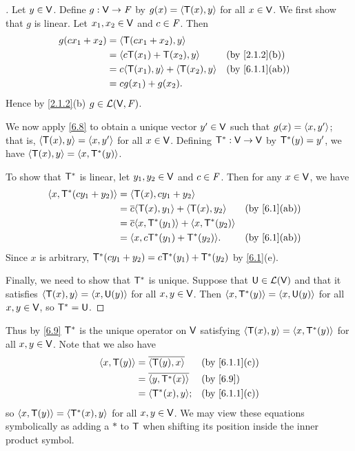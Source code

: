 \begin{proof}[]
	Let \(y \in \mathsf{V}\).
	Define \(g : \mathsf{V} \to \mathit{F}\) by \(g(x) = \left\langle\mathsf{T}(x), y\right\rangle\) for all \(x \in \mathsf{V}\).
	We first show that \(g\) is linear.
	Let \(x_1, x_2 \in \mathsf{V}\) and \(c \in \mathit{F}\).
	Then
	\begin{align*}
		g(c x_1 + x_2) & = \inn{\T(c x_1 + x_2), y}                                  \\
		               & = \inn{c \T(x_1) + \T(x_2), y}          &  & \by{2.1.2}[b]  \\
		               & = c \inn{\T(x_1), y} + \inn{\T(x_2), y} &  & \by{6.1.1}[ab] \\
		               & = c g(x_1) + g(x_2).
	\end{align*}
	Hence by \cref{2.1.2}(b) \(g \in \mathcal{L}(\mathsf{V}, \mathit{F})\).

	We now apply \cref{6.8} to obtain a unique vector \(y' \in \mathsf{V}\) such that \(g(x) = \left\langle x, y'\right\rangle\);
	that is, \(\left\langle\mathsf{T}(x), y\right\rangle = \left\langle x, y'\right\rangle\) for all \(x \in \mathsf{V}\).
	Defining \(\mathsf{T}^* : \mathsf{V} \to \mathsf{V}\) by \(\mathsf{T}^*(y) = y'\), we have \(\left\langle\mathsf{T}(x), y\right\rangle = \left\langle x, \mathsf{T}^*(y)\right\rangle\).

	To show that \(\mathsf{T}^*\) is linear, let \(y_1, y_2 \in \mathsf{V}\) and \(c \in \mathit{F}\).
	Then for any \(x \in \mathsf{V}\),
	we have
	\begin{align*}
		\inn{x, \T^*(c y_1 + y_2)} & = \inn{\T(x), c y_1 + y_2}                                           \\
		                           & = \conj{c} \inn{\T(x), y_1} + \inn{\T(x), y_2}     &  & \by{6.1}[ab] \\
		                           & = \conj{c} \inn{x, \T^*(y_1)} + \inn{x, \T^*(y_2)}                   \\
		                           & = \inn{x, c \T^*(y_1) + \T^*(y_2)}.                &  & \by{6.1}[ab]
	\end{align*}
	Since \(x\) is arbitrary, \(\mathsf{T}^*(c y_1 + y_2) = c \mathsf{T}^*(y_1) + \mathsf{T}^*(y_2)\) by \cref{6.1}(e).

	Finally, we need to show that \(\mathsf{T}^*\) is unique. Suppose that \(\mathsf{U} \in \mathcal{L}(\mathsf{V})\) and that it satisfies \(\left\langle\mathsf{T}(x), y\right\rangle = \left\langle x, \mathsf{U}(y)\right\rangle\) for all \(x, y \in \mathsf{V}\).
	Then \(\left\langle x, \mathsf{T}^*(y)\right\rangle = \left\langle x, \mathsf{U}(y)\right\rangle\) for all \(x, y \in \mathsf{V}\), so \(\mathsf{T}^* = \mathsf{U}\).
\end{proof}

\begin{note}
	Thus by \cref{6.9} \(\mathsf{T}^*\) is the unique operator on \(\mathsf{V}\) satisfying \(\left\langle\mathsf{T}(x), y\right\rangle = \left\langle x, \mathsf{T}^*(y)\right\rangle\) for all \(x, y \in \mathsf{V}\).
	Note that we also have
	\begin{align*}
		\inn{x, \T(y)} & = \conj{\inn{\T(y), x}}   &  & \by{6.1.1}[c] \\
		               & = \conj{\inn{y, \T^*(x)}} &  & \by{6.9}      \\
		               & = \inn{\T^*(x), y};       &  & \by{6.1.1}[c]
	\end{align*}
	so \(\left\langle x, \mathsf{T}(y)\right\rangle = \left\langle\mathsf{T}^*(x), y\right\rangle\) for all \(x, y \in \mathsf{V}\).
	We may view these equations symbolically as adding a \(*\) to \(\mathsf{T}\) when shifting its position inside the inner product symbol.
\end{note}

